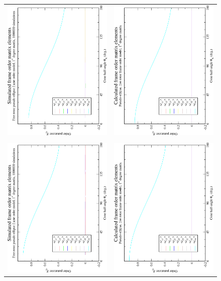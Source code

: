 \begin{figure}
\centering
  \begin{tabular}{@{}cc@{}}
    \includegraphics[width=.35\textwidth,angle=270]{images/frame_order_matrix/Sij_pseudo-ellipse_free_rotor_in_frame_theta_x_ens1000000.eps} &
    \includegraphics[width=.35\textwidth,angle=270]{images/frame_order_matrix/Sij_pseudo-ellipse_free_rotor_in_frame_theta_x_calc.eps} \\
    \\[-5pt]
    \includegraphics[width=.35\textwidth,angle=270]{images/frame_order_matrix/Sij_pseudo-ellipse_free_rotor_in_frame_theta_y_ens1000000.eps} &
    \includegraphics[width=.35\textwidth,angle=270]{images/frame_order_matrix/Sij_pseudo-ellipse_free_rotor_in_frame_theta_y_calc.eps} \\

\end{tabular}
\end{figure}
